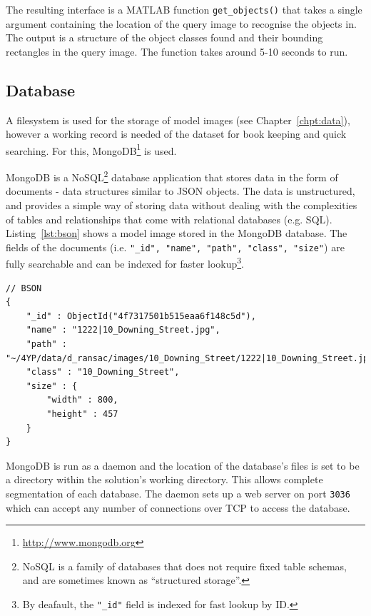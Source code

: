\documentclass[11pt, onecolumn, a4paper, final]{report} %
\begin{document}
The resulting interface is a MATLAB function \lstinline!get_objects()! that takes a single argument containing the location of the query image to recognise the objects in. The output is a structure of the object classes found and their bounding rectangles in the query image. The function takes around 5-10 seconds to run.

\subsection{Database}

A filesystem is used for the storage of model images (see Chapter~\ref{chpt:data}), however a working record is needed of the dataset for book keeping and quick searching. For this, MongoDB\footnote{\url{http://www.mongodb.org}} is used. 

MongoDB is a NoSQL\footnote{NoSQL is a family of databases that does not require fixed table schemas, and are sometimes known as ``structured storage''.} database application that stores data in the form of documents - data structures similar to JSON objects. The data is unstructured, and provides a simple way of storing data without dealing with the complexities of tables and relationships that come with relational databases (e.g. SQL). Listing~\ref{lst:bson} shows a model image stored in the MongoDB database. The fields of the documents (i.e. \lstinline!"_id", "name", "path", "class", "size"!) are fully searchable and can be indexed for faster lookup\footnote{By deafault, the \lstinline!"_id"! field is indexed for fast lookup by ID.}. 


\linespread{1} %
\lstset{language=Java,caption=A document representing a model image stored in MongoDB.,label=lst:bson}
\begin{lstlisting}[frame=single]
// BSON
{
	"_id" : ObjectId("4f7317501b515eaa6f148c5d"),
	"name" : "1222|10_Downing_Street.jpg",
	"path" : "~/4YP/data/d_ransac/images/10_Downing_Street/1222|10_Downing_Street.jpg",
	"class" : "10_Downing_Street",
	"size" : {
		"width" : 800,
		"height" : 457
	}
}
\end{lstlisting}
\linespread{2} %

MongoDB is run as a daemon and the location of the database's files is set to be a directory within the solution's working directory. This allows complete segmentation of each database. The daemon sets up a web server on port \lstinline!3036! which can accept any number of connections over TCP to access the database.
\end{document}
